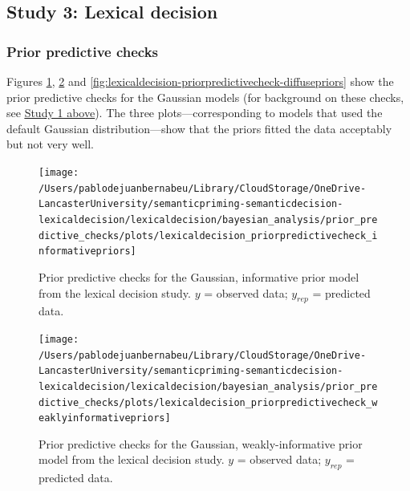 \documentclass[
  12pt,
  man,floatsintext]{apa7}
\begin{document}
\hypertarget{study-3-lexical-decision-3}{%
\subsection{Study 3: Lexical decision}\label{study-3-lexical-decision-3}}

\hypertarget{prior-predictive-checks-2}{%
\subsubsection{Prior predictive checks}\label{prior-predictive-checks-2}}

Figures \ref{fig:lexicaldecision-priorpredictivecheck-informativepriors}, \ref{fig:lexicaldecision-priorpredictivecheck-weaklyinformativepriors} and \ref{fig:lexicaldecision-priorpredictivecheck-diffusepriors} show the prior predictive checks for the Gaussian models (for background on these checks, see \protect\hyperlink{study1-bayesian-diagnostics}{\underline{Study 1 above}}). The three plots---corresponding to models that used the default Gaussian distribution---show that the priors fitted the data acceptably but not very well.



\begin{figure}

{\centering \texttt{[image: /Users/pablodejuanbernabeu/Library/CloudStorage/OneDrive-LancasterUniversity/semanticpriming-semanticdecision-lexicaldecision/lexicaldecision/bayesian\_analysis/prior\_predictive\_checks/plots/lexicaldecision\_priorpredictivecheck\_informativepriors]} 

}

\caption{Prior predictive checks for the Gaussian, informative prior model from the lexical decision study. \(y\) = observed data; \(y_{rep}\) = predicted data.}\label{fig:lexicaldecision-priorpredictivecheck-informativepriors}
\end{figure}



\begin{figure}

{\centering \texttt{[image: /Users/pablodejuanbernabeu/Library/CloudStorage/OneDrive-LancasterUniversity/semanticpriming-semanticdecision-lexicaldecision/lexicaldecision/bayesian\_analysis/prior\_predictive\_checks/plots/lexicaldecision\_priorpredictivecheck\_weaklyinformativepriors]} 

}

\caption{Prior predictive checks for the Gaussian, weakly-informative prior model from the lexical decision study. \(y\) = observed data; \(y_{rep}\) = predicted data.}\label{fig:lexicaldecision-priorpredictivecheck-weaklyinformativepriors}
\end{figure}
\end{document}

